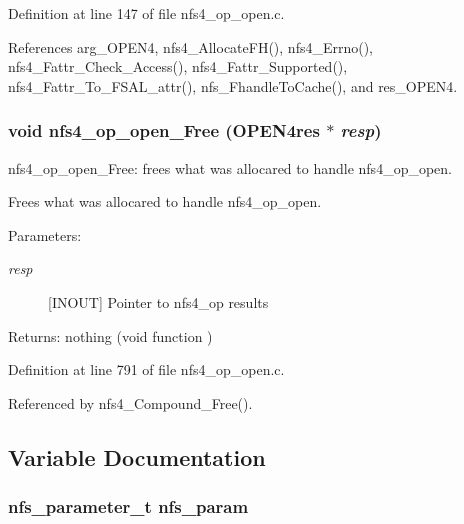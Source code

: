 Definition at line 147 of file nfs4\_\-op\_\-open.c.

References arg\_\-OPEN4, nfs4\_\-Allocate\-FH(), nfs4\_\-Errno(), nfs4\_\-Fattr\_\-Check\_\-Access(), nfs4\_\-Fattr\_\-Supported(), nfs4\_\-Fattr\_\-To\_\-FSAL\_\-attr(), nfs\_\-Fhandle\-To\-Cache(), and res\_\-OPEN4.
\subsubsection{\setlength{\rightskip}{0pt plus 5cm}void nfs4\_\-op\_\-open\_\-Free (OPEN4res $\ast$ {\em resp})}\label{nfs4__op__open_8c_a5}


nfs4\_\-op\_\-open\_\-Free: frees what was allocared to handle nfs4\_\-op\_\-open.

Frees what was allocared to handle nfs4\_\-op\_\-open.

\begin{Desc}
\item[Parameters:]
\begin{description}
\item[{\em resp}][INOUT] Pointer to nfs4\_\-op results\end{description}
\end{Desc}
\begin{Desc}
\item[Returns:]nothing (void function ) \end{Desc}


Definition at line 791 of file nfs4\_\-op\_\-open.c.

Referenced by nfs4\_\-Compound\_\-Free().

\subsection{Variable Documentation}
\subsubsection{\setlength{\rightskip}{0pt plus 5cm}nfs\_\-parameter\_\-t {\bf nfs\_\-param}}\label{nfs4__op__open_8c_a2}


